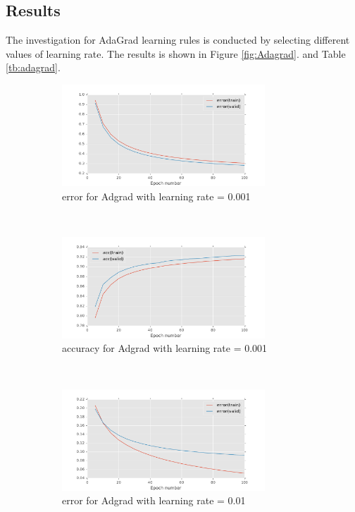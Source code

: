 \documentclass[11pt]{article}
\begin{document}
\subsection{Results}
The investigation for AdaGrad learning rules is conducted by selecting different values of learning rate. The results is shown in Figure \ref{fig:Adagrad}. and Table \ref{tb:adagrad}.
\begin{figure}[t!]
    \centering
    \begin{subfigure}[t]{0.45\textwidth}
        \centering
        \includegraphics[height=1.5in]{error_with_Adgrad_0_001.pdf}
        \caption{error for Adgrad with learning rate = 0.001}
    \end{subfigure}   
    ~
    \begin{subfigure}[t]{0.45\textwidth}
        \centering
        \includegraphics[height=1.5in]{acc_with_Adgrad_0_001.pdf}
        \caption{accuracy for Adgrad with learning rate = 0.001}
    \end{subfigure}    
	~
    \begin{subfigure}[t]{0.45\textwidth}
        \centering
        \includegraphics[height=1.5in]{error_with_Adgrad_0_01.pdf}
        \caption{error for Adgrad with learning rate = 0.01}
    \end{subfigure}   
    ~
    \begin{subfigure}[t]{0.45\textwidth}

\end{subfigure}
\end{figure}
\end{document}
